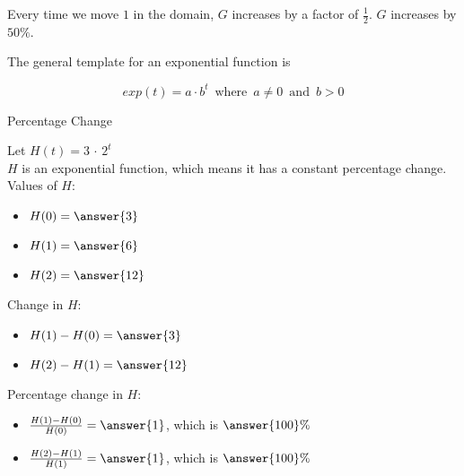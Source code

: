 \documentclass{ximera}
\begin{document}
Every time we move $1$ in the domain, $G$ increases by a factor of $\frac{1}{2}$.  $G$ increases by $50\%$.





The general template for an exponential function is 

\[   exp(t) = a \cdot b^t   \, \text{ where } \,  a \ne 0  \, \text{ and } \,    b > 0   \]



\begin{example} Percentage Change



Let $H(t) = 3 \, \cdot \, 2^t$ \\

$H$ is an exponential function, which means it has a constant percentage change. \\

Values of $H$:

\begin{itemize}
\item $H(0) = \answer{3}$

\item $H(1) = \answer{6}$

\item $H(2) = \answer{12}$
\end{itemize}



Change in $H$:

\begin{itemize}
\item $H(1) - H(0) = \answer{3}$

\item $H(2) - H(1) = \answer{12}$

\end{itemize}





Percentage change in $H$:

\begin{itemize}
\item $\frac{H(1) - H(0)}{H(0)} = \answer{1}$, which is $\answer{100}\%$

\item $\frac{H(2) - H(1)}{H(1)} = \answer{1}$, which is $\answer{100}\%$

\end{itemize}






\end{example}
\end{document}

